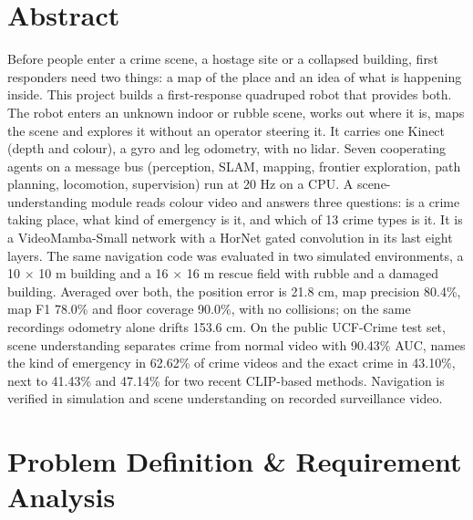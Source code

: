 \documentclass[11pt, a4paper]{article}
\begin{document}
\section{Abstract}
\noindent
Before people enter a crime scene, a hostage site or a collapsed building, first responders need two things: a map of the place and an idea of what is happening inside. This project builds a first-response quadruped robot that provides both. The robot enters an unknown indoor or rubble scene, works out where it is, maps the scene and explores it without an operator steering it. It carries one Kinect (depth and colour), a gyro and leg odometry, with no lidar. Seven cooperating agents on a message bus (perception, SLAM, mapping, frontier exploration, path planning, locomotion, supervision) run at 20 Hz on a CPU. A scene-understanding module reads colour video and answers three questions: is a crime taking place, what kind of emergency is it, and which of 13 crime types is it. It is a VideoMamba-Small network with a HorNet gated convolution in its last eight layers. The same navigation code was evaluated in two simulated environments, a 10 $\times$ 10 m building and a 16 $\times$ 16 m rescue field with rubble and a damaged building. Averaged over both, the position error is 21.8 cm, map precision 80.4\%, map F1 78.0\% and floor coverage 90.0\%, with no collisions; on the same recordings odometry alone drifts 153.6 cm. On the public UCF-Crime test set, scene understanding separates crime from normal video with 90.43\% AUC, names the kind of emergency in 62.62\% of crime videos and the exact crime in 43.10\%, next to 41.43\% and 47.14\% for two recent CLIP-based methods. Navigation is verified in simulation and scene understanding on recorded surveillance video.

\section{Problem Definition \& Requirement Analysis}
\end{document}
